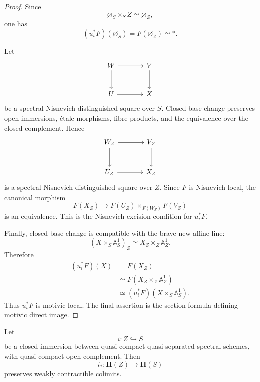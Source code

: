 \begin{proof}
Since
\[
    \varnothing_S\times_SZ
    \simeq
    \varnothing_Z,
\]
one has
\[
    (u_i^*F)(\varnothing_S)
    =
    F(\varnothing_Z)
    \simeq
    *.
\]

Let
\[
\begin{tikzcd}[column sep=large, row sep=large]
    W \arrow[r] \arrow[d]
    &
    V \arrow[d]
    \\
    U \arrow[r]
    &
    X
\end{tikzcd}
\]
be a spectral Nisnevich distinguished square over \(S\).  Closed base
change preserves open immersions, étale morphisms, fibre products, and
the equivalence over the closed complement.  Hence
\[
\begin{tikzcd}[column sep=large, row sep=large]
    W_Z \arrow[r] \arrow[d]
    &
    V_Z \arrow[d]
    \\
    U_Z \arrow[r]
    &
    X_Z
\end{tikzcd}
\]
is a spectral Nisnevich distinguished square over \(Z\).  Since \(F\)
is Nisnevich-local, the canonical morphism
\[
    F(X_Z)
    \longrightarrow
    F(U_Z)
    \times_{F(W_Z)}
    F(V_Z)
\]
is an equivalence.  This is the Nisnevich-excision condition for
\(u_i^*F\).

Finally, closed base change is compatible with the brave new affine
line:
\[
    (X\times_S\mathbb A^1_S)_Z
    \simeq
    X_Z\times_Z\mathbb A^1_Z.
\]
Therefore
\[
\begin{aligned}
    (u_i^*F)(X)
    &=
    F(X_Z)
    \\
    &\simeq
    F(X_Z\times_Z\mathbb A^1_Z)
    \\
    &\simeq
    (u_i^*F)(X\times_S\mathbb A^1_S).
\end{aligned}
\]
Thus \(u_i^*F\) is motivic-local.  The final assertion is the section
formula defining motivic direct image.
\end{proof}

\begin{theorem}
\label{thm:closed-direct-image-weakly-contractible-colimits}
Let
\[
    i
    \colon
    Z
    \hookrightarrow
    S
\]
be a closed immersion between quasi-compact quasi-separated spectral
schemes, with quasi-compact open complement.  Then
\[
    i_*
    \colon
    \mathbf H(Z)
    \longrightarrow
    \mathbf H(S)
\]
preserves weakly contractible colimits.
\end{theorem}

